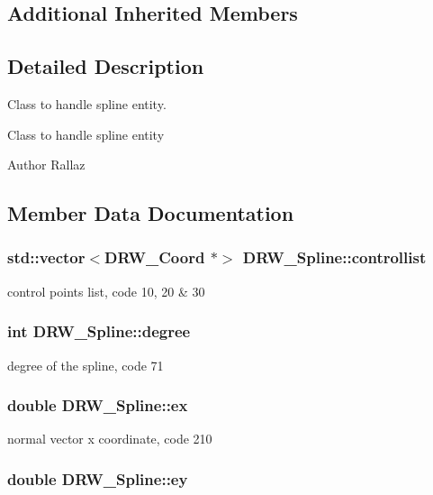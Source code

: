 \subsection*{Additional Inherited Members}


\subsection{Detailed Description}
Class to handle spline entity. 

Class to handle spline entity \begin{DoxyAuthor}{Author}
Rallaz 
\end{DoxyAuthor}


\subsection{Member Data Documentation}
\hypertarget{classDRW__Spline_a37b5e6ce7e32c1577fed59c3704c0e0f}{
\subsubsection[{controllist}]{\setlength{\rightskip}{0pt plus 5cm}std\-::vector$<${\bf D\-R\-W\-\_\-\-Coord} $\ast$$>$ D\-R\-W\-\_\-\-Spline\-::controllist}}\label{classDRW__Spline_a37b5e6ce7e32c1577fed59c3704c0e0f}
control points list, code 10, 20 \& 30 \hypertarget{classDRW__Spline_af60e9efc3c39f418196cca4cc9f8125b}{
\subsubsection[{degree}]{\setlength{\rightskip}{0pt plus 5cm}int D\-R\-W\-\_\-\-Spline\-::degree}}\label{classDRW__Spline_af60e9efc3c39f418196cca4cc9f8125b}
degree of the spline, code 71 \hypertarget{classDRW__Spline_a7d2455d56e3de91a85a7afd1a5b34dfe}{
\subsubsection[{ex}]{\setlength{\rightskip}{0pt plus 5cm}double D\-R\-W\-\_\-\-Spline\-::ex}}\label{classDRW__Spline_a7d2455d56e3de91a85a7afd1a5b34dfe}
normal vector x coordinate, code 210 \hypertarget{classDRW__Spline_a937a3c0c4450e383de5ebbbbc892d1ad}{
\subsubsection[{ey}]{\setlength{\rightskip}{0pt plus 5cm}double D\-R\-W\-\_\-\-Spline\-::ey}}\label{classDRW__Spline_a937a3c0c4450e383de5ebbbbc892d1ad}

